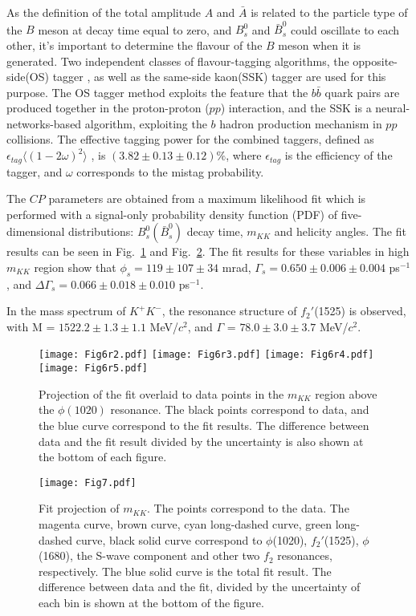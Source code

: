 \documentclass[10pt]{article}
\def\CP                {{\ensuremath{C\!P}}\xspace}
\begin{document}
As the definition of the total amplitude $A$ and $\bar{A}$ is related to the particle type of the $B$ meson at decay time equal to zero, and $B_s^0$ and $\bar{B}_s^0$ could oscillate to each other,  it's important to determine the flavour of the $B$ meson when it is generated. Two independent classes of flavour-tagging algorithms, the opposite-side(OS) tagger \cite{Aaij:2012mu}, as well as the same-side kaon(SSK) tagger \cite{Aaij:2016psi} are used for this purpose. The OS tagger method exploits the feature that the $b\bar{b}$ quark pairs are produced together in the proton-proton ($pp$) interaction, and the SSK  is a neural-networks-based algorithm, exploiting the $b$ hadron production mechanism in $pp$ collisions. The effective tagging power for the combined taggers, defined as $\epsilon_{tag}\langle (1-2\omega)^2 \rangle$ , is $(3.82 \pm 0.13\pm0.12)\%$, where $\epsilon_{tag}$ is the efficiency of the tagger, and $\omega$ corresponds to the mistag probability.



The \CP parameters are obtained from a maximum likelihood fit  which is performed with a signal-only probability density function (PDF) of five-dimensional distributions: $B_s^0 (\bar{B}_s^0)$ decay time, $m_{KK}$ and helicity angles. 
The fit results can be seen in Fig.~\ref{fig:projections1}  and  Fig.~\ref{fig:projections2}. The fit results for these variables in high $m_{KK}$ region show that $\phi_s = 119 \pm 107 \pm 34$ mrad, $\Gamma_s = 0.650 \pm 0.006 \pm 0.004$ ps$^{-1}$, and $\Delta \Gamma_s = 0.066 \pm 0.018 \pm 0.010$ ps$^{-1}$.

In the mass spectrum of $K^+ K^-$, the resonance structure of $f_2'$(1525) is observed, with M = $1522.2 \pm 1.3 \pm 1.1$ MeV/$c^2$, and $\Gamma$ = $78.0 \pm 3.0 \pm 3.7$ MeV/$c^2$.

\begin{figure}[htb]
\centering
\texttt{[image: Fig6r2.pdf]}
\texttt{[image: Fig6r3.pdf]}
\texttt{[image: Fig6r4.pdf]}
\texttt{[image: Fig6r5.pdf]}
\caption{Projection of the fit overlaid to data points in the $m_{KK}$ region above the $\phi(1020)$ resonance. The black points correspond to data, and the blue curve correspond to the fit results.  The difference between data and the fit result divided by the uncertainty is also shown at the bottom of each figure.}
\label{fig:projections1}
\end{figure}

\begin{figure}[htb]
\centering
\texttt{[image: Fig7.pdf]}
\caption{Fit projection of $m_{KK}$. The points correspond to the data. The magenta curve, brown curve, cyan long-dashed curve, green long-dashed curve, black solid curve correspond to  $\phi$(1020),  $f_2'$(1525), $\phi$(1680), the S-wave component and other two $f_2$ resonances, respectively. The blue solid curve is the total fit result. The difference between data and the fit, divided by the uncertainty of each bin is shown at the bottom of the figure.}
\label{fig:projections2}
\end{figure}
\end{document}
